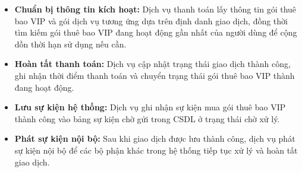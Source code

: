 \begin{itemize}

\item \textbf{Chuẩn bị thông tin kích hoạt:}
Dịch vụ thanh toán
lấy thông tin gói thuê bao VIP
và gói dịch vụ tương ứng dựa trên định danh giao dịch,
đồng thời tìm kiếm gói thuê bao VIP
đang hoạt động gần nhất của người dùng để cộng dồn thời hạn sử dụng nếu cần.

\item \textbf{Hoàn tất thanh toán:}
Dịch vụ cập nhật
trạng thái giao dịch thành công,
ghi nhận thời điểm thanh toán
và chuyển trạng thái gói thuê bao VIP thành đang hoạt động.

\item \textbf{Lưu sự kiện hệ thống:}
Dịch vụ ghi nhận sự kiện mua gói thuê bao VIP thành công
vào bảng sự kiện chờ gửi trong CSDL ở trạng thái chờ xử lý.

\item \textbf{Phát sự kiện nội bộ:}
Sau khi giao dịch được lưu thành công,
dịch vụ phát sự kiện nội bộ để các bộ phận khác
trong hệ thống tiếp tục xử lý và hoàn tất giao dịch.

\end{itemize}
